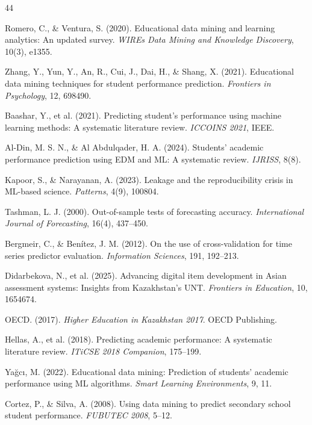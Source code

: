\documentclass[11pt]{article}
\begin{document}
\begin{thebibliography}{44}

Romero, C., \& Ventura, S. (2020). Educational data mining and learning analytics: An
updated survey. \textit{WIREs Data Mining and Knowledge Discovery}, 10(3), e1355.

Zhang, Y., Yun, Y., An, R., Cui, J., Dai, H., \& Shang, X. (2021). Educational data
mining techniques for student performance prediction. \textit{Frontiers in Psychology}, 12,
698490.

Baashar, Y., et al. (2021). Predicting student's performance using machine learning
methods: A systematic literature review. \textit{ICCOINS 2021}, IEEE.

Al-Din, M. S. N., \& Al Abdulqader, H. A. (2024). Students' academic performance
prediction using EDM and ML: A systematic review. \textit{IJRISS}, 8(8).

Kapoor, S., \& Narayanan, A. (2023). Leakage and the reproducibility crisis in ML-based
science. \textit{Patterns}, 4(9), 100804.

Tashman, L. J. (2000). Out-of-sample tests of forecasting accuracy.
\textit{International Journal of Forecasting}, 16(4), 437--450.

Bergmeir, C., \& Ben\'{i}tez, J. M. (2012). On the use of cross-validation for time
series predictor evaluation. \textit{Information Sciences}, 191, 192--213.

Didarbekova, N., et al. (2025). Advancing digital item development in Asian assessment
systems: Insights from Kazakhstan's UNT. \textit{Frontiers in Education}, 10, 1654674.

OECD. (2017). \textit{Higher Education in Kazakhstan 2017}. OECD Publishing.

Hellas, A., et al. (2018). Predicting academic performance: A systematic literature
review. \textit{ITiCSE 2018 Companion}, 175--199.

Ya\u{g}c{\i}, M. (2022). Educational data mining: Prediction of students' academic
performance using ML algorithms. \textit{Smart Learning Environments}, 9, 11.

Cortez, P., \& Silva, A. (2008). Using data mining to predict secondary school student
performance. \textit{FUBUTEC 2008}, 5--12.


\end{thebibliography}
\end{document}

